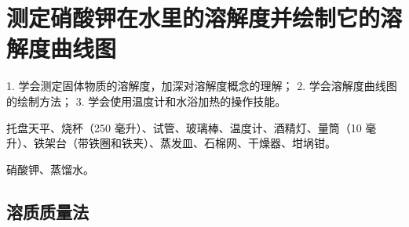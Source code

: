\section{测定硝酸钾在水里的溶解度并绘制它的溶解度曲线图\footnotemark}\label{sec:xssy-xzsy1}

\begin{shiyanmudi}
    1. 学会测定固体物质的溶解度，加深对溶解度概念的理解； 2. 学会溶解度曲线图的绘制方法； 3. 学会使用温度计和水浴加热的操作技能。
\end{shiyanmudi}


\begin{shiyanyongpin}
    托盘天平、烧杯（250 毫升）、试管、玻璃棒、温度计、酒精灯、量筒（10 毫升）、铁架台（带铁圈和铁夹）、蒸发皿、石棉网、干燥器、坩埚钳。

    硝酸钾、蒸馏水。
\end{shiyanyongpin}


\subsection{溶质质量法}


